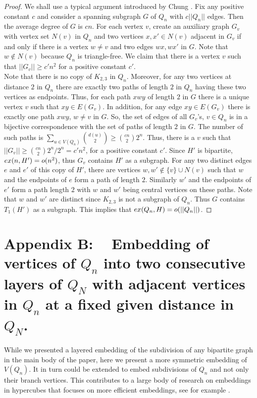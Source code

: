 \documentclass[11pt, a4paper]{article}
\newcommand{\ex}{{\rm  ex}}
\begin{document}
\begin{proof}
We shall use a typical argument introduced by Chung \cite{chung}.  Fix any positive constant $c$ and consider a spanning subgraph $G$  of $Q_n$ with $c||Q_n||$ edges.  Then the average degree of $G$ is $cn$.
For each vertex $v$, create an auxiliary graph $G_v$ with vertex set $N(v)$ in $Q_n$ and two vertices $x, x' \in N(v)$ adjacent in $G_v$ if and only if  there is a vertex $w\neq v$ and 
two edges $wx, wx'$ in $G$.  Note that $w\not\in N(v)$ because $Q_n$ is triangle-free. We claim that there is a vertex $v$ such that $||G_v||\geq c'n^2$ for a positive constant $c'$.
\\

Note that there is no copy of $K_{2,3}$ in $Q_n$.  Moreover, for any two vertices at distance $2$ in $Q_n$ there are exactly two paths of length $2$ in $Q_n$ having these two vertices as endpoints. Thus, for each path $xwy$ of length $2$ in $G$  there is a unique vertex $v$ such that  $xy\in E(G_v)$. In addition, for any edge $xy\in E(G_v)$ there is exactly one path $xwy$, $w\neq v$ in $G$. So, the set of  edges of  all $G_v$'s, $v\in Q_n$  is in a bijective correspondence with the set of paths of length $2$ in $G$.  The number of such paths is $\sum_{u\in V(Q_n)} \binom{d(u)}{2} \geq  \binom{cn}{2} 2^n$. Thus, there is a $v$ such that $||G_v|| \geq \binom{cn}{2} 2^n/2^n  = c' n^2$, for a positive constant $c'$.
Since $H'$ is bipartite,  $\ex(n, H') =o(n^2)$, thus $G_v$ contains $H'$ as a subgraph. %
For any two distinct edges $e$ and $e'$ of this copy of $H'$, there are vertices $w, w' \not\in \{v\}\cup N(v)$ such that $w$ and the endpoints of $e$ form a path of length $2$. Similarly $w'$ and the endpoints of $e'$ form a path length $2$ with $w$ and $w'$ being central vertices on these paths.  Note that $w$ and $w'$ are distinct since $K_{2,3}$ is not a subgraph of $Q_n$.   Thus $G$ contains $T_1(H')$ as a subgraph. This implies that $\ex(Q_n, H)= o(||Q_n||)$. 
\end{proof}




\section{Appendix B: ~ Embedding of  vertices of $Q_n$ into two consecutive layers of $Q_N$  with adjacent vertices in $Q_n$ at a fixed given  distance in $Q_N$.}


While we presented a layered embedding of the subdivision of any bipartite graph in the main body of the paper, 
here we present a more symmetric embedding of $V(Q_n)$. It in turn could be extended to embed subdivisions of $Q_n$ and not only their branch vertices.
This contributes to a large body of research on embeddings in hypercubes that focuses on more efficient embeddings, see for example \cite{LS, FHT, AHL, VS, BCHRS, AS, MARR,  H, B, HS, X, Chen, LT}.
\end{document}
